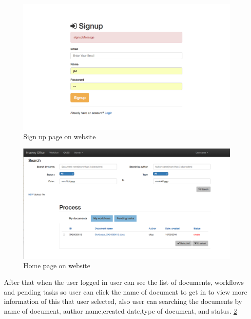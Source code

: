 \begin{figure}[H!]
	\centering
	\includegraphics[scale=0.4]{res/Screen_Shot3}
	\caption{Sign up page on website}
	\label{fig:screenshot_signup}
\end{figure}


\begin{figure}[H!]
	\centering
	\includegraphics[scale=0.3]{res/Screen_Shot2}
	\caption{Home page on website}
	\label{fig:screenshot_home}
\end{figure}

After that when the user logged in 	user can see the list of documents, workflows and pending tasks so user can click the name of document to get in to view more information of this that user selected, also user can searching the documents by name of document, author name,created date,type of document, and status. \ref{fig:screenshot_home}




